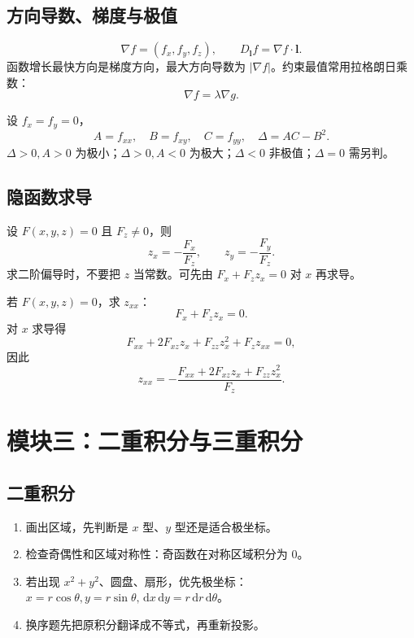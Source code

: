 \documentclass[UTF8,zihao=-4]{ctexart}
\newcommand{\dd}{\,\mathrm d}
\newcommand{\ve}[1]{\bm{#1}}
\newcommand{\grad}{\nabla}
\begin{document}
\subsection{方向导数、梯度与极值}
\begin{keybox}[梯度]
\[
\grad f=(f_x,f_y,f_z),\qquad D_{\ve l}f=\grad f\cdot \ve l.
\]
函数增长最快方向是梯度方向，最大方向导数为 $|\grad f|$。约束最值常用拉格朗日乘数：
\[
\grad f=\lambda \grad g.
\]
\end{keybox}

\begin{keybox}[二元极值判别]
设 $f_x=f_y=0$，
\[
A=f_{xx},\quad B=f_{xy},\quad C=f_{yy},\quad \Delta=AC-B^2.
\]
$\Delta>0,A>0$ 为极小；$\Delta>0,A<0$ 为极大；$\Delta<0$ 非极值；$\Delta=0$ 需另判。
\end{keybox}

\subsection{隐函数求导}
\begin{methodbox}[一个方程确定 $z=z(x,y)$]
设 $F(x,y,z)=0$ 且 $F_z\ne0$，则
\[
z_x=-\frac{F_x}{F_z},\qquad z_y=-\frac{F_y}{F_z}.
\]
求二阶偏导时，不要把 $z$ 当常数。可先由 $F_x+F_z z_x=0$ 对 $x$ 再求导。
\end{methodbox}

\begin{examplebox}[二阶隐偏导套路]
若 $F(x,y,z)=0$，求 $z_{xx}$：
\[
F_x+F_z z_x=0.
\]
对 $x$ 求导得
\[
F_{xx}+2F_{xz}z_x+F_{zz}z_x^2+F_z z_{xx}=0,
\]
因此
\[
z_{xx}=-\frac{F_{xx}+2F_{xz}z_x+F_{zz}z_x^2}{F_z}.
\]
\end{examplebox}

\section{模块三：二重积分与三重积分}

\subsection{二重积分}
\begin{methodbox}[二重积分固定步骤]
\begin{enumerate}
  \item 画出区域，先判断是 $x$ 型、$y$ 型还是适合极坐标。
  \item 检查奇偶性和区域对称性：奇函数在对称区域积分为 0。
  \item 若出现 $x^2+y^2$、圆盘、扇形，优先极坐标：$x=r\cos\theta,y=r\sin\theta,\dd x\dd y=r\dd r\dd\theta$。
  \item 换序题先把原积分翻译成不等式，再重新投影。
\end{enumerate}
\end{methodbox}
\end{document}
